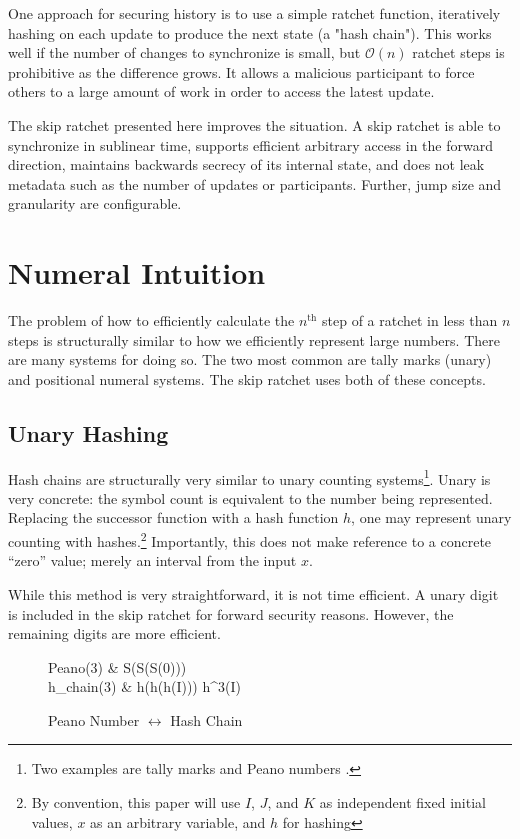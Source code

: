 \documentclass{article}
\begin{document}
    One approach for securing history is to use a simple ratchet function, iteratively hashing on each update to produce the next state (a "hash chain"). This works well if the number of changes to synchronize is small, but $\mathcal{O}(n)$ ratchet steps is prohibitive as the difference grows. It allows a malicious participant to force others to a large amount of work in order to access the latest update.
    
    The skip ratchet presented here improves the situation. A skip ratchet is able to synchronize in sublinear time, supports efficient arbitrary access in the forward direction, maintains backwards secrecy of its internal state, and does not leak metadata such as the number of updates or participants. Further, jump size and granularity are configurable.
    
    \section{Numeral Intuition}
    
    The problem of how to efficiently calculate the $n^{\text{th}}$ step of a ratchet in less than $n$ steps is structurally similar to how we efficiently represent large numbers. There are many systems for doing so. The two most common are tally marks (unary) and positional numeral systems. The skip ratchet uses both of these concepts.
    
	\subsection{Unary Hashing}

	Hash chains are structurally very similar to unary counting systems\footnote{Two examples are tally marks and Peano numbers \cite{peano-wikipedia}.}. Unary is very concrete: the symbol count is equivalent to the number being represented. Replacing the successor function with a hash function $h$, one may represent unary counting with hashes.\footnote{By convention, this paper will use $I$, $J$, and $K$ as independent fixed initial values, $x$ as an arbitrary variable, and $h$ for hashing} Importantly, this does not make reference to a concrete ``zero'' value; merely an interval from the input $x$.
	
	While this method is very straightforward, it is not time efficient. A unary digit is included in the skip ratchet for forward security reasons. However, the remaining digits are more efficient.
	
    \begin{figure}[h]
		\centering
		
		\begin{flalign}
			Peano(3) & \Rightarrow S(S(S(0))) \nonumber \\
			h_{chain}(3)  & \Rightarrow h(h(h(I))) \equiv h^{3}(I) \nonumber 
		\end{flalign}
	
		\caption{Peano Number $\leftrightarrow$ Hash Chain}
		\label{fig:peano-hash-equiv}
	\end{figure}
    
\end{document}
